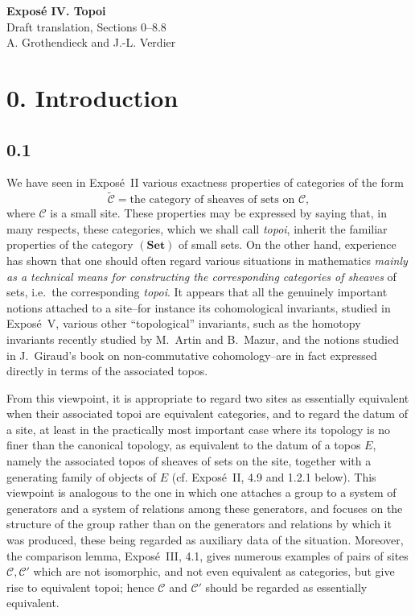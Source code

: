 \documentclass[11pt]{article}
\newcommand{\C}{\mathcal{C}}
\newcommand{\Set}{\mathbf{Set}}
\newcommand{\ie}{i.e.}
\begin{document}
\begin{center}
{\Large \textbf{Expos\'e IV. Topoi}}\\[0.35em]
{\large Draft translation, Sections 0--8.8}\\[0.35em]
A. Grothendieck and J.-L. Verdier
\end{center}

\bigskip


\section*{0. Introduction}

\subsection*{0.1}
We have seen in Expos\'e~II various exactness properties of categories of the form
\[
\widetilde{\C}=\text{the category of sheaves of sets on }\C,
\]
where \(\C\) is a small site. These properties may be expressed by saying that, in many respects, these categories, which we shall call \emph{topoi}, inherit the familiar properties of the category \((\Set)\) of small sets. On the other hand, experience has shown that one should often regard various situations in mathematics \emph{mainly as a technical means for constructing the corresponding categories of sheaves} of sets, \ie\ the corresponding \emph{topoi}. It appears that all the genuinely important notions attached to a site--for instance its cohomological invariants, studied in Expos\'e~V, various other ``topological'' invariants, such as the homotopy invariants recently studied by M.~Artin and B.~Mazur, and the notions studied in J.~Giraud's book on non-commutative cohomology--are in fact expressed directly in terms of the associated topos.

From this viewpoint, it is appropriate to regard two sites as essentially equivalent when their associated topoi are equivalent categories, and to regard the datum of a site, at least in the practically most important case where its topology is no finer than the canonical topology, as equivalent to the datum of a topos \(E\), namely the associated topos of sheaves of sets on the site, together with a generating family of objects of \(E\) (cf. Expos\'e~II, 4.9 and 1.2.1 below). This viewpoint is analogous to the one in which one attaches a group to a system of generators and a system of relations among these generators, and focuses on the structure of the group rather than on the generators and relations by which it was produced, these being regarded as auxiliary data of the situation. Moreover, the comparison lemma, Expos\'e~III, 4.1, gives numerous examples of pairs of sites \(\C,\C'\) which are not isomorphic, and not even equivalent as categories, but give rise to equivalent topoi; hence \(\C\) and \(\C'\) should be regarded as essentially equivalent.
\end{document}
